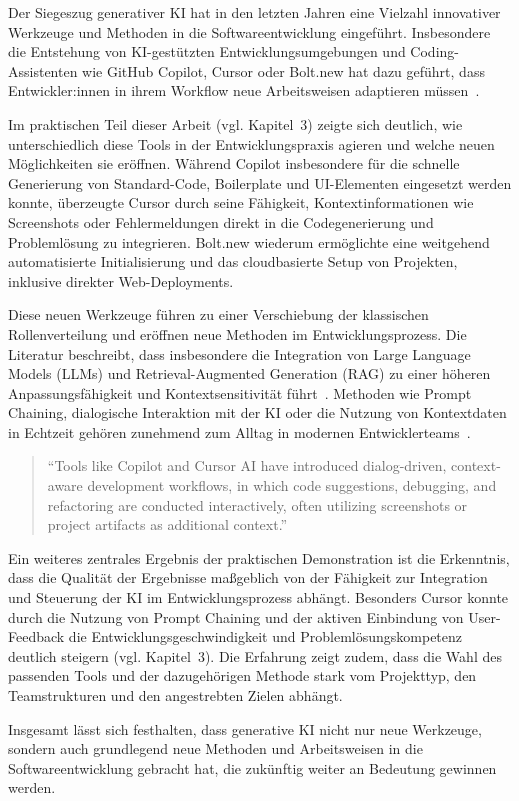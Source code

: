 Der Siegeszug generativer KI hat in den letzten Jahren eine Vielzahl
innovativer Werkzeuge und Methoden in die Softwareentwicklung eingeführt.
Insbesondere die Entstehung von KI-gestützten Entwicklungsumgebungen und
Coding-Assistenten wie GitHub Copilot, Cursor oder Bolt.new hat dazu geführt,
dass Entwickler:innen in ihrem Workflow neue Arbeitsweisen adaptieren
müssen~\cite{10741797,Weisz_2024,fraunhofer2024}.

Im praktischen Teil dieser Arbeit (vgl. Kapitel~3) zeigte sich deutlich, wie
unterschiedlich diese Tools in der Entwicklungspraxis agieren und welche neuen
Möglichkeiten sie eröffnen. Während Copilot insbesondere für die schnelle
Generierung von Standard-Code, Boilerplate und UI-Elementen eingesetzt werden
konnte, überzeugte Cursor durch seine Fähigkeit, Kontextinformationen wie
Screenshots oder Fehlermeldungen direkt in die Codegenerierung und
Problemlösung zu integrieren. Bolt.new wiederum ermöglichte eine weitgehend
automatisierte Initialisierung und das cloudbasierte Setup von Projekten,
inklusive direkter Web-Deployments.

Diese neuen Werkzeuge führen zu einer Verschiebung der klassischen
Rollenverteilung und eröffnen neue Methoden im Entwicklungsprozess. Die
Literatur beschreibt, dass insbesondere die Integration von Large Language
Models (LLMs) und Retrieval-Augmented Generation (RAG) zu einer höheren
Anpassungsfähigkeit und Kontextsensitivität
führt~\cite{esposito2025,donvir2024}. Methoden wie Prompt Chaining, dialogische
Interaktion mit der KI oder die Nutzung von Kontextdaten in Echtzeit gehören
zunehmend zum Alltag in modernen Entwicklerteams~\cite{weisz2024}.

\begin{quote}
    \enquote{Tools like Copilot and Cursor AI have introduced dialog-driven, context-aware development workflows, in which code suggestions, debugging, and refactoring are conducted interactively, often utilizing screenshots or project artifacts as additional context.}
    \cite[S.~10]{donvir2024}
\end{quote}

Ein weiteres zentrales Ergebnis der praktischen Demonstration ist die
Erkenntnis, dass die Qualität der Ergebnisse maßgeblich von der Fähigkeit zur
Integration und Steuerung der KI im Entwicklungsprozess abhängt. Besonders
Cursor konnte durch die Nutzung von Prompt Chaining und der aktiven Einbindung
von User-Feedback die Entwicklungsgeschwindigkeit und Problemlösungskompetenz
deutlich steigern (vgl. Kapitel~3). Die Erfahrung zeigt zudem, dass die Wahl
des passenden Tools und der dazugehörigen Methode stark vom Projekttyp, den
Teamstrukturen und den angestrebten Zielen abhängt.

Insgesamt lässt sich festhalten, dass generative KI nicht nur neue Werkzeuge,
sondern auch grundlegend neue Methoden und Arbeitsweisen in die
Softwareentwicklung gebracht hat, die zukünftig weiter an Bedeutung gewinnen
werden.

